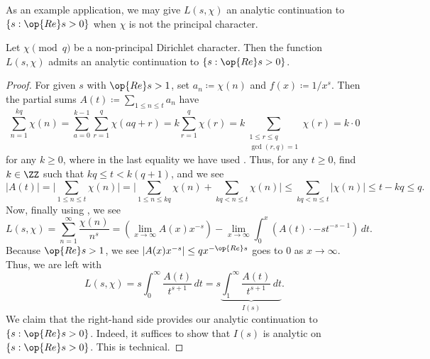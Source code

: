 \documentclass[../notes.tex]{subfiles}
\begin{document}
As an example application, we may give $L(s,\chi)$ an analytic continuation to $\{s:\op{Re}s>0\}$ when $\chi$ is not the principal character.
\begin{proposition} \label{prop:continue-l-chi}
	Let $\chi\pmod q$ be a non-principal Dirichlet character. Then the function $L(s,\chi)$ admits an analytic continuation to $\{s:\op{Re}s>0\}$.
\end{proposition}
\begin{proof}
	For given $s$ with $\op{Re}s>1$, set $a_n\coloneqq\chi(n)$ and $f(x)\coloneqq1/x^s$. Then the partial sums $A(t)\coloneqq\sum_{1\le n\le t}a_n$ have
	\[\sum_{n=1}^{kq}\chi(n)=\sum_{a=0}^{k-1}\sum_{r=1}^q\chi(aq+r)=k\sum_{r=1}^q\chi(r)=k\sum_{\substack{1\le r\le q\\\gcd(r,q)=1}}\chi(r)=k\cdot0\]
	for any $k\ge0$, where in the last equality we have used . Thus, for any $t\ge0$, find $k\in\ZZ$ such that $kq\le t<k(q+1)$, and we see
	\[|A(t)|=\Bigg|\sum_{1\le n\le t}\chi(n)\Bigg|=\Bigg|\sum_{1\le n\le kq}\chi(n)+\sum_{kq<n\le t}\chi(n)\Bigg|\le\sum_{kq<n\le t}|\chi(n)|\le t-kq\le q.\]
	Now, finally using , we see
	\[L(s,\chi)=\sum_{n=1}^\infty\frac{\chi(n)}{n^s}=\left(\lim_{x\to\infty}A(x)x^{-s}\right)-\lim_{x\to\infty}\int_0^x\left(A(t)\cdot -st^{-s-1}\right)\,dt.\]
	Because $\op{Re}s>1$, we see $\left|A(x)x^{-s}\right|\le qx^{-\op{Re}s}$ goes to $0$ as $x\to\infty$. Thus, we are left with
	\[L(s,\chi)=s\int_0^\infty\frac{A(t)}{t^{s+1}}\,dt=s\underbrace{\int_1^\infty\frac{A(t)}{t^{s+1}}\,dt}_{I(s)}.\]
	We claim that the right-hand side provides our analytic continuation to $\{s:\op{Re}s>0\}$. Indeed, it suffices to show that $I(s)$ is analytic on $\{s:\op{Re}s>0\}$. This is technical.
	

\end{proof}
\end{document}
